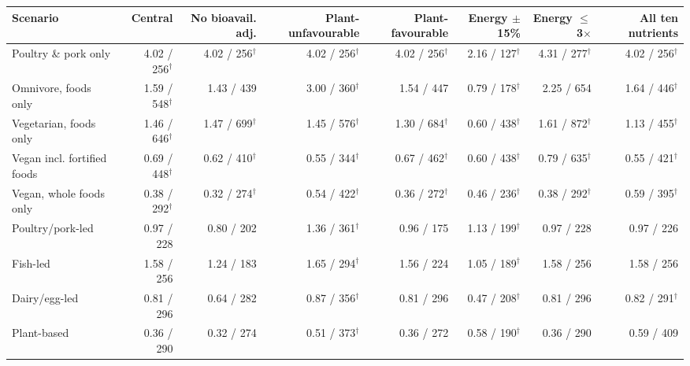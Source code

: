 \begin{tabular}{lrrrrrrr}
\toprule
Scenario & Central & No bioavail. adj. & Plant-unfavourable & Plant-favourable & Energy $\pm$15\% & Energy $\le$3$\times$ & All ten nutrients \\
\midrule
Poultry \& pork only & 4.02 / 256$^\dagger$ & 4.02 / 256$^\dagger$ & 4.02 / 256$^\dagger$ & 4.02 / 256$^\dagger$ & 2.16 / 127$^\dagger$ & 4.31 / 277$^\dagger$ & 4.02 / 256$^\dagger$ \\
Omnivore, foods only & 1.59 / 548$^\dagger$ & 1.43 / 439 & 3.00 / 360$^\dagger$ & 1.54 / 447 & 0.79 / 178$^\dagger$ & 2.25 / 654 & 1.64 / 446$^\dagger$ \\
Vegetarian, foods only & 1.46 / 646$^\dagger$ & 1.47 / 699$^\dagger$ & 1.45 / 576$^\dagger$ & 1.30 / 684$^\dagger$ & 0.60 / 438$^\dagger$ & 1.61 / 872$^\dagger$ & 1.13 / 455$^\dagger$ \\
Vegan incl. fortified foods & 0.69 / 448$^\dagger$ & 0.62 / 410$^\dagger$ & 0.55 / 344$^\dagger$ & 0.67 / 462$^\dagger$ & 0.60 / 438$^\dagger$ & 0.79 / 635$^\dagger$ & 0.55 / 421$^\dagger$ \\
Vegan, whole foods only & 0.38 / 292$^\dagger$ & 0.32 / 274$^\dagger$ & 0.54 / 422$^\dagger$ & 0.36 / 272$^\dagger$ & 0.46 / 236$^\dagger$ & 0.38 / 292$^\dagger$ & 0.59 / 395$^\dagger$ \\
\midrule
Poultry/pork-led & 0.97 / 228 & 0.80 / 202 & 1.36 / 361$^\dagger$ & 0.96 / 175 & 1.13 / 199$^\dagger$ & 0.97 / 228 & 0.97 / 226 \\
Fish-led & 1.58 / 256 & 1.24 / 183 & 1.65 / 294$^\dagger$ & 1.56 / 224 & 1.05 / 189$^\dagger$ & 1.58 / 256 & 1.58 / 256 \\
Dairy/egg-led & 0.81 / 296 & 0.64 / 282 & 0.87 / 356$^\dagger$ & 0.81 / 296 & 0.47 / 208$^\dagger$ & 0.81 / 296 & 0.82 / 291$^\dagger$ \\
Plant-based & 0.36 / 290 & 0.32 / 274 & 0.51 / 373$^\dagger$ & 0.36 / 272 & 0.58 / 190$^\dagger$ & 0.36 / 290 & 0.59 / 409 \\
\bottomrule
\end{tabular}

